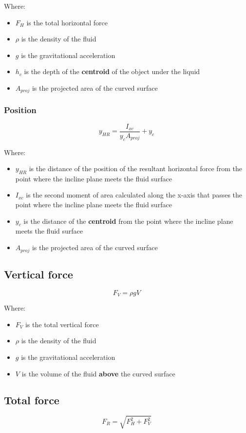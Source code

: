 \documentclass[11pt]{article}
\begin{document}
Where:
\begin{itemize}
\item \(F_H\) is the total horizontal force
\item \(\rho\) is the density of the fluid
\item \(g\) is the gravitational acceleration
\item \(h_c\) is the depth of the \textbf{centroid} of the object under the liquid
\item \(A_{proj}\) is the projected area of the curved surface
\end{itemize}

\subsubsection{Position}
\label{sec:org085f006}
\[y_{HR} = \frac{I_{xc}}{y_c A_{proj}} + y_c\]

Where:
\begin{itemize}
\item \(y_{HR}\) is the distance of the position of the resultant horizontal force from the point where the incline plane meets the fluid surface
\item \(I_{xc}\) is the second moment of area calculated along the x-axis that passes the point where the incline plane meets the fluid surface
\item \(y_c\) is the distance of the \textbf{centroid} from the point where the incline plane meets the fluid surface
\item \(A_{proj}\) is the projected area of the curved surface
\end{itemize}

\subsection{Vertical force}
\label{sec:org28ee754}
\[F_V = \rho g V\]

Where:
\begin{itemize}
\item \(F_V\) is the total vertical force
\item \(\rho\) is the density of the fluid
\item \(g\) is the gravitational acceleration
\item \(V\) is the volume of the fluid \textbf{above} the curved surface
\end{itemize}

\subsection{Total force}
\label{sec:orgc1e5192}
\[F_R = \sqrt{F_H^2 + F_V^2}\]
\end{document}
